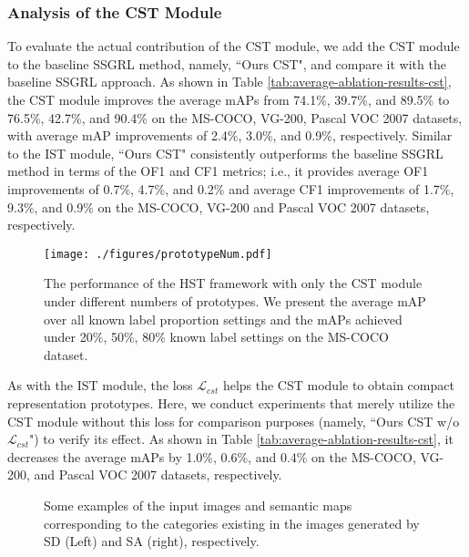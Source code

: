 \subsubsection{Analysis of the CST Module}
\label{sec:exp-cst}
To evaluate the actual contribution of the CST module, we add the CST module to the baseline SSGRL method, namely, ``Ours CST", and compare it with the baseline SSGRL approach. As shown in Table \ref{tab:average-ablation-results-cst}, the CST module improves the average mAPs from 74.1\%, 39.7\%, and 89.5\% to 76.5\%, 42.7\%, and 90.4\% on the MS-COCO, VG-200, Pascal VOC 2007 datasets, with average mAP improvements of 2.4\%, 3.0\%, and 0.9\%, respectively. Similar to the IST module, ``Ours CST" consistently outperforms the baseline SSGRL method in terms of the OF1 and CF1 metrics; i.e., it provides average OF1 improvements of 0.7\%, 4.7\%, and 0.2\% and average CF1 improvements of 1.7\%, 9.3\%, and 0.9\% on the MS-COCO, VG-200 and Pascal VOC 2007 datasets, respectively. 

\begin{figure}[!t]
   \centering
   \texttt{[image: ./figures/prototypeNum.pdf]}
   \caption{The performance of the HST framework with only the CST module under different numbers of prototypes. We present the average mAP over all known label proportion settings and the mAPs achieved under 20\%, 50\%, 80\% known label settings on the MS-COCO dataset.}
   \label{fig:prototypenum}
\end{figure}

As with the IST module, the loss $\mathcal{L}_{cst}$ helps the CST module to obtain compact representation prototypes. Here, we conduct experiments that merely utilize the CST module without this loss for comparison purposes (namely, ``Ours CST w/o $\mathcal{L}_{cst}$") to verify its effect. As shown in Table \ref{tab:average-ablation-results-cst}, it decreases the average mAPs by 1.0\%, 0.6\%, and 0.4\% on the MS-COCO, VG-200, and Pascal VOC 2007 datasets, respectively.


\begin{figure*}[!t]
\centering
{}
\vspace{-10pt}
\caption{Some examples of the input images and semantic maps corresponding to the categories existing in the images generated by SD (Left) and SA (right), respectively.}
\label{fig:visualization}
\end{figure*}

